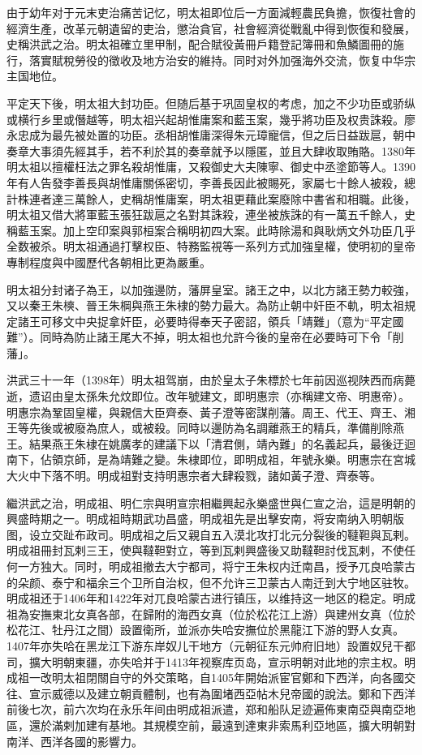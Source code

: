 由于幼年对于元末吏治痛苦记忆，明太祖即位后一方面減輕農民負擔，恢復社會的經濟生產，改革元朝遺留的吏治，懲治貪官，社會經濟從戰亂中得到恢復和發展，史稱洪武之治。明太祖確立里甲制，配合賦役黃冊戶籍登記簿冊和魚鱗圖冊的施行，落實賦稅勞役的徵收及地方治安的維持。同时对外加强海外交流，恢复中华宗主国地位。

平定天下後，明太祖大封功臣。但随后基于巩固皇权的考虑，加之不少功臣或骄纵或横行乡里或僭越等，明太祖兴起胡惟庸案和藍玉案，幾乎將功臣及权贵誅殺。廖永忠成为最先被处置的功臣。丞相胡惟庸深得朱元璋寵信，但之后日益跋扈，朝中奏章大事須先經其手，若不利於其的奏章就予以隱匿，並且大肆收取賄賂。1380年明太祖以擅權枉法之罪名殺胡惟庸，又殺御史大夫陳寧、御史中丞塗節等人。1390年有人告發李善長與胡惟庸關係密切，李善長因此被賜死，家屬七十餘人被殺，總計株連者達三萬餘人，史稱胡惟庸案，明太祖更藉此案廢除中書省和相職。此後，明太祖又借大將軍藍玉張狂跋扈之名對其誅殺，連坐被族誅的有一萬五千餘人，史稱藍玉案。加上空印案與郭桓案合稱明初四大案。此時除湯和與耿炳文外功臣几乎全数被杀。明太祖通過打擊权臣、特務監視等一系列方式加強皇權，使明初的皇帝專制程度與中國歷代各朝相比更為嚴重。

明太祖分封诸子為王，以加強邊防，藩屏皇室。諸王之中，以北方諸王勢力較強，又以秦王朱樉、晉王朱棡與燕王朱棣的勢力最大。為防止朝中奸臣不軌，明太祖規定諸王可移文中央捉拿奸臣，必要時得奉天子密詔，領兵「靖難」（意为“平定國難”）。同時為防止諸王尾大不掉，明太祖也允許今後的皇帝在必要時可下令「削藩」。

洪武三十一年（1398年）明太祖驾崩，由於皇太子朱標於七年前因巡视陕西而病薨逝，遗诏由皇太孫朱允炆即位。改年號建文，即明惠宗（亦稱建文帝、明惠帝）。明惠宗為鞏固皇權，與親信大臣齊泰、黃子澄等密謀削藩。周王、代王、齊王、湘王等先後或被廢為庶人，或被殺。同時以邊防為名調離燕王的精兵，準備削除燕王。結果燕王朱棣在姚廣孝的建議下以「清君側，靖內難」的名義起兵，最後迂迴南下，佔領京師，是為靖難之變。朱棣即位，即明成祖，年號永樂。明惠宗在宮城大火中下落不明。明成祖對支持明惠宗者大肆殺戮，諸如黃子澄、齊泰等。

繼洪武之治，明成祖、明仁宗與明宣宗相繼興起永樂盛世與仁宣之治，這是明朝的興盛時期之一。明成祖時期武功昌盛，明成祖先是出擊安南，将安南纳入明朝版图，设立交趾布政司。明成祖之后又親自五入漠北攻打北元分裂後的韃靼與瓦剌。明成祖冊封瓦剌三王，使與韃靼對立，等到瓦剌興盛後又助韃靼討伐瓦剌，不使任何一方独大。同时，明成祖撤去大宁都司，将宁王朱权内迁南昌，授予兀良哈蒙古的朵颜、泰宁和福余三个卫所自治权，但不允许三卫蒙古人南迁到大宁地区驻牧。明成祖还于1406年和1422年对兀良哈蒙古进行镇压，以维持这一地区的稳定。明成祖為安撫東北女真各部，在歸附的海西女真（位於松花江上游）與建州女真（位於松花江、牡丹江之間）設置衛所，並派亦失哈安撫位於黑龍江下游的野人女真。1407年亦失哈在黑龙江下游东岸奴儿干地方（元朝征东元帅府旧地）設置奴兒干都司，擴大明朝東疆，亦失哈并于1413年视察库页岛，宣示明朝对此地的宗主权。明成祖一改明太祖閉關自守的外交策略，自1405年開始派宦官鄭和下西洋，向各國交往、宣示威德以及建立朝貢體制，也有為圍堵西亞帖木兒帝國的說法。鄭和下西洋前後七次，前六次均在永乐年间由明成祖派遣，郑和船队足迹遍佈東南亞與南亞地區，還於滿剌加建有基地。其規模空前，最遠到達東非索馬利亞地區，擴大明朝對南洋、西洋各國的影響力。

